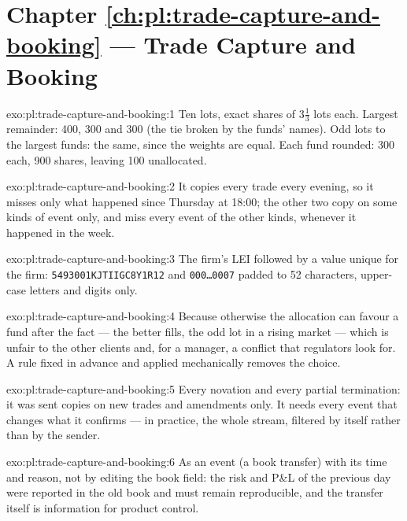 \section*{Chapter \ref{ch:pl:trade-capture-and-booking} --- Trade Capture and Booking}

\begin{solution}{exo:pl:trade-capture-and-booking:1}
Ten lots, exact shares of $3\tfrac13$ lots each. Largest remainder: 400, 300 and 300 (the tie broken by the funds' names). Odd lots to the
largest funds: the same, since the weights are equal. Each fund rounded: 300 each, 900 shares, leaving 100 unallocated.
\end{solution}

\begin{solution}{exo:pl:trade-capture-and-booking:2}
It copies every trade every evening, so it misses only what happened since Thursday at 18:00; the other two copy on some kinds of event only,
and miss every event of the other kinds, whenever it happened in the week.
\end{solution}

\begin{solution}{exo:pl:trade-capture-and-booking:3}
The firm's LEI followed by a value unique for the firm: \texttt{5493001KJTIIGC8Y1R12} and \texttt{000\dots0007} padded to 52 characters,
upper-case letters and digits only.
\end{solution}

\begin{solution}{exo:pl:trade-capture-and-booking:4}
Because otherwise the allocation can favour a fund after the fact --- the better fills, the odd lot in a rising market --- which is unfair to the
other clients and, for a manager, a conflict that regulators look for. A rule fixed in advance and applied mechanically removes the choice.
\end{solution}

\begin{solution}{exo:pl:trade-capture-and-booking:5}
Every novation and every partial termination: it was sent copies on new trades and amendments only. It needs every event that changes what it
confirms --- in practice, the whole stream, filtered by itself rather than by the sender.
\end{solution}

\begin{solution}{exo:pl:trade-capture-and-booking:6}
As an event (a book transfer) with its time and reason, not by editing the book field: the risk and P\&L of the previous day were reported in the
old book and must remain reproducible, and the transfer itself is information for product control.
\end{solution}

